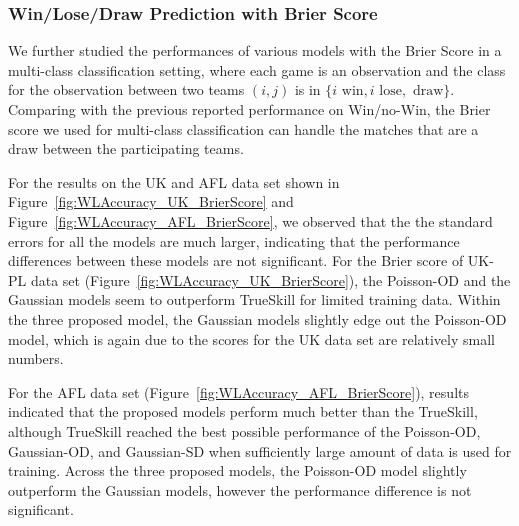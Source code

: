 \subsubsection{Win/Lose/Draw Prediction with Brier Score}
We further studied the performances of various models with the Brier Score in a multi-class classification setting, where each game is an observation and the class for the observation between two teams $(i, j)$ is in $\{i\text{ win}, i\text{ lose}, \text{ draw}\}$. Comparing with the previous reported performance on Win/no-Win, the Brier score we used for multi-class classification can handle the matches that are a draw between the participating teams. 

For the results on the UK and AFL data set shown in Figure~\ref{fig:WLAccuracy_UK_BrierScore} and Figure~\ref{fig:WLAccuracy_AFL_BrierScore}, we observed that the the standard errors for all the models are much larger, indicating that the performance differences between these models are not significant. For the Brier score of UK-PL data set (Figure~\ref{fig:WLAccuracy_UK_BrierScore}), the Poisson-OD and the Gaussian models seem to outperform TrueSkill for limited training data. Within the three proposed model, the Gaussian models slightly edge out the Poisson-OD model, which is again due to the scores for the UK data set are relatively small numbers. 
\begin{center}
\begin{figure*}[t!]
 \centering
\caption{\small Results on the UK data set, evaluated using the Brier Score for multi-class classification. Error bars indicate
standard errors.}
\label{fig:WLAccuracy_UK_BrierScore}
\end{figure*}
\end{center}

For the AFL data set (Figure~\ref{fig:WLAccuracy_AFL_BrierScore}), results indicated that the proposed models perform much better than the TrueSkill, although TrueSkill reached the best possible performance of the Poisson-OD, Gaussian-OD, and Gaussian-SD when sufficiently large amount of data is used for training. Across the three proposed models, the Poisson-OD model slightly outperform the Gaussian models, however the performance difference is not significant. 
\begin{center}
\begin{figure*}[t!]
 \centering
\caption{\small Results on the AFL data set, evaluated using the Brier Score for Win/Lose/Draw prediction. Error bars indicate
standard errors.}
\label{fig:WLAccuracy_AFL_BrierScore}
\end{figure*}
\end{center}

